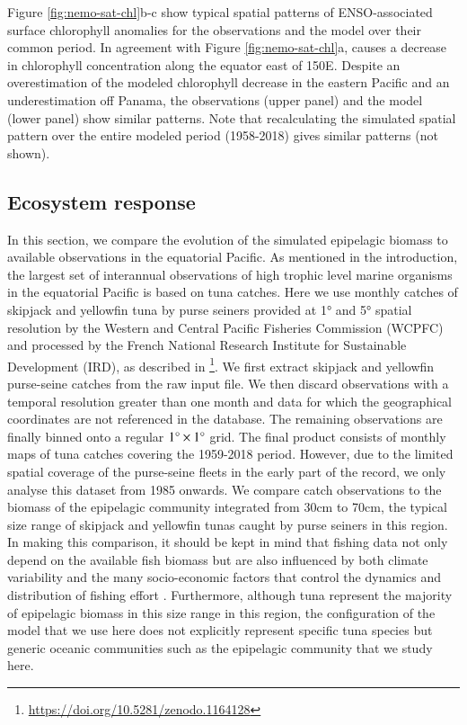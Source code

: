 Figure \ref{fig:nemo-sat-chl}b-c show typical spatial patterns of ENSO-associated surface chlorophyll anomalies for the observations and the model over their common period. In agreement with Figure \ref{fig:nemo-sat-chl}a, \nino{} causes a decrease in chlorophyll concentration along the equator east of 150\degree{}E. Despite an overestimation of the modeled chlorophyll decrease in the eastern Pacific and an underestimation off Panama, the observations (upper panel) and the model (lower panel) show similar patterns. Note that recalculating the simulated spatial pattern over the entire modeled period (1958-2018) gives similar patterns (not shown). 

\subsection{Ecosystem response}

In this section, we compare the evolution of the simulated epipelagic biomass to available observations in the equatorial Pacific. As mentioned in the introduction, the largest set of interannual observations of high trophic level marine organisms in the equatorial Pacific is based on tuna catches. Here we use monthly catches of skipjack and yellowfin tuna by purse seiners provided at 1° and 5° spatial resolution by the Western and Central Pacific Fisheries Commission (WCPFC) and processed by the French National Research Institute for Sustainable Development (IRD), as described in  \cite{taconetGlobalMonthlyCatch2018}\footnote{\url{https://doi.org/10.5281/zenodo.1164128}}. We first extract skipjack and yellowfin purse-seine catches from the raw input file. We then discard observations with a temporal resolution greater than one month and data for which the geographical coordinates are not referenced in the database. The remaining observations are finally binned onto a regular $1\degree{} \times 1\degree{}$ grid. The final product consists of monthly maps of tuna catches covering the 1959-2018 period. However, due to the limited spatial coverage of the purse-seine fleets in the early part of the record, we only analyse this dataset from 1985 onwards. We compare catch observations to the biomass of the epipelagic community integrated from 30cm to 70cm, the typical size range of  skipjack and yellowfin tunas caught by purse seiners in this region. In making this comparison, it should be kept in mind that fishing data not only depend on the available fish biomass but are also influenced by both climate variability and the many socio-economic factors that control the dynamics and distribution of fishing effort \citep{hobdayDetectingClimateImpacts2013}. Furthermore, although tuna represent the majority of epipelagic biomass in this size range in this region, the configuration of the model that we use here does not explicitly represent specific tuna species but generic oceanic communities such as the epipelagic community that we study here.

